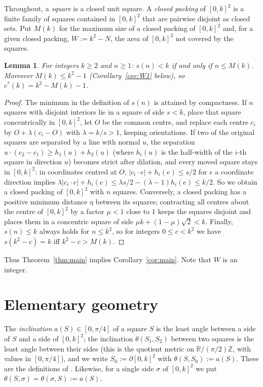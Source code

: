 \documentclass[11pt]{amsart}
\newtheorem{lemma}[theorem]{Lemma}
\theoremstyle{definition}
\theoremstyle{remark}
\newcommand{\R}{\mathbb{R}}
\newcommand{\Z}{\mathbb{Z}}
\begin{document}
Throughout, a \emph{square} is a closed unit square. A \emph{closed packing} of $[0,k]^2$ is a finite family of squares
contained in $[0,k]^2$ that are pairwise disjoint as closed sets. Put $M(k)$ for the maximum size of a closed packing
of $[0,k]^2$ and, for a given closed packing, $W:=k^2-N$, the area of $[0,k]^2$ not covered by the squares.

\begin{lemma}\label{lem:red}
For integers $k\ge 2$ and $n\ge 1$: $s(n)<k$ if and only if $n\le M(k)$. Moreover $M(k)\le k^2-1$
\textup{(}Corollary~\ref{cor:W1} below\textup{)}, so $c^*(k)=k^2-M(k)-1$.
\end{lemma}

\begin{proof}
The minimum in the definition of $s(n)$ is attained by compactness. If $n$ squares with disjoint interiors lie in a
square of side $s<k$, place that square concentrically in $[0,k]^2$, let $O$ be the common centre, and replace each centre $c_i$ by
$O+\lambda(c_i-O)$ with $\lambda=k/s>1$, keeping orientations. If two of the original squares are separated by a line with normal $u$,
the separation $u\cdot(c_2-c_1)\ge h_1(u)+h_2(u)$ (where $h_i(u)$ is the half-width of the $i$-th square in direction $u$) becomes strict after
dilation, and every moved square stays in $[0,k]^2$: in coordinates centred at $O$, $|c_i\cdot e|+h_i(e)\le s/2$ for $e$ a
coordinate direction implies $\lambda|c_i\cdot e|+h_i(e)\le \lambda s/2-(\lambda-1)h_i(e)\le k/2$. So we obtain a closed packing of $[0,k]^2$ with $n$ squares.
Conversely, a closed packing has a positive minimum distance $\eta$ between its squares; contracting all centres
about the centre of $[0,k]^2$ by a factor $\mu<1$ close to $1$ keeps the squares disjoint and places them in a
concentric square of side $\mu k+(1-\mu)\sqrt 2<k$. Finally, $s(n)\le k$ always holds for $n\le k^2$, so
for integers $0\le c<k^2$ we have $s(k^2-c)=k$ iff $k^2-c>M(k)$.
\end{proof}

Thus Theorem~\ref{thm:main} implies Corollary~\ref{cor:main}. Note that $W$ is an integer.

\section{Elementary geometry}

The \emph{inclination} $a(S)\in[0,\pi/4]$ of a square $S$ is the least angle between a side of $S$ and a side of
$[0,k]^2$; the inclination $\theta(S_1,S_2)$ between two squares is the least angle between their sides
(this is the quotient metric on $\R/(\pi/2)\Z$, with values in $[0,\pi/4]$), and we write $S_0:=\partial[0,k]^2$ with
$\theta(S,S_0):=a(S)$. These are the definitions of \cite{RV}. Likewise, for a single side $\sigma$ of $[0,k]^2$ we put
$\theta(S,\sigma)=\theta(\sigma,S):=a(S)$.
\end{document}
